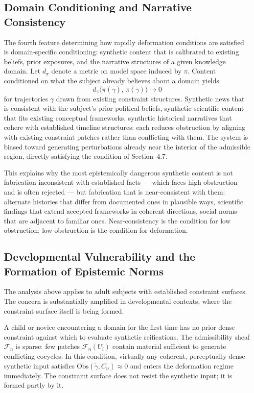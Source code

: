 \documentclass[12pt, a4paper]{article}
\begin{document}
\subsection{Domain Conditioning and Narrative Consistency}

The fourth feature determining how rapidly deformation conditions are satisfied is domain-specific conditioning: synthetic content that is calibrated to existing beliefs, prior exposures, and the narrative structures of a given knowledge domain. Let $d_\pi$ denote a metric on model space induced by $\pi$. Content conditioned on what the subject already believes about a domain yields
\[
d_\pi\bigl(\pi(\tilde{\gamma}),\, \pi(\gamma)\bigr) \rightarrow 0
\]
for trajectories $\gamma$ drawn from existing constraint structures. Synthetic news that is consistent with the subject's prior political beliefs, synthetic scientific content that fits existing conceptual frameworks, synthetic historical narratives that cohere with established timeline structures: each reduces obstruction by aligning with existing constraint patches rather than conflicting with them. The system is biased toward generating perturbations already near the interior of the admissible region, directly satisfying the condition of Section~4.7.

This explains why the most epistemically dangerous synthetic content is not fabrication inconsistent with established facts — which faces high obstruction and is often rejected — but fabrication that is near-consistent with them: alternate histories that differ from documented ones in plausible ways, scientific findings that extend accepted frameworks in coherent directions, social norms that are adjacent to familiar ones. Near-consistency is the condition for low obstruction; low obstruction is the condition for deformation.

\subsection{Developmental Vulnerability and the Formation of Epistemic Norms}

The analysis above applies to adult subjects with established constraint surfaces. The concern is substantially amplified in developmental contexts, where the constraint surface itself is being formed.

A child or novice encountering a domain for the first time has no prior dense constraint against which to evaluate synthetic reifications. The admissibility sheaf $\mathcal{F}_n$ is sparse: few patches $\mathcal{F}_n(U_i)$ contain material sufficient to generate conflicting cocycles. In this condition, virtually any coherent, perceptually dense synthetic input satisfies $\mathrm{Obs}(\tilde{\gamma}, C_n) \approx 0$ and enters the deformation regime immediately. The constraint surface does not resist the synthetic input; it is formed partly by it.
\end{document}
